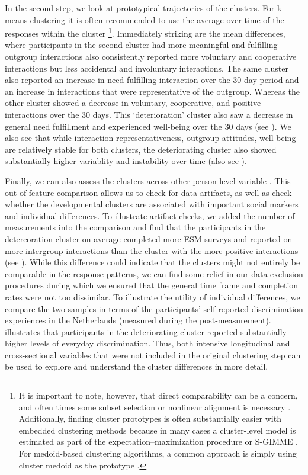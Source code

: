 In the second step, we look at prototypical trajectories of the
clusters. For k-means clustering it is often recommended to use the
average over time of the responses within the cluster
\citep[see ][]{niennattrakul2007}\footnote{It is important to note, however, that direct comparability can be a concern, and often times some subset selection or nonlinear alignment is necessary \citep[e.g.,][]{gupta1996}. Additionally, finding cluster prototypes is often substantially easier with embedded clustering methods because in many cases a cluster-level model is estimated as part of the expectation–maximization procedure \citep[e.g.,][]{denteuling2021} or S-GIMME \citep[e.g.][]{lane2019}. For medoid-based clustering algorithms, a common approach is simply using cluster medoid as the prototype \citep{kaufman1990}.}.
Immediately striking are the mean differences, where participants in the
second cluster had more meaningful and fulfilling outgroup interactions
also consistently reported more voluntary and cooperative interactions
but less accidental and involuntary interactions. The same cluster also
reported an increase in need fulfilling interaction over the 30 day
period and an increase in interactions that were representative of the
outgroup. Whereas the other cluster showed a decrease in voluntary,
cooperative, and positive interactions over the 30 days. This
`deterioration' cluster also saw a decrease in general need fulfillment
and experienced well-being over the 30 days (see
). We also see that while interaction
representativeness, outgroup attitudes, well-being are relatively stable
for both clusters, the deteriorating cluster also showed substantially
higher variablity and instability over time (also see
).

Finally, we can also assess the clusters across other person-level
variable \citep[e.g.,][]{monden2022}. This out-of-feature comparison
allows us to check for data artifacts, as well as check whether the
developmental clusters are associated with important social markers and
individual differences. To illustrate artifact checks, we added the
number of measurements into the comparison and find that the
participants in the detereoration cluster on average completed more ESM
surveys and reported on more intergroup interactions than the cluster
with the more positive interactions (see ).
While this difference could indicate that the clusters might not
entirely be comparable in the response patterns, we can find some relief
in our data exclusion procedures during which we ensured that the
general time frame and completion rates were not too dissimilar. To
illustrate the utility of individual differences, we compare the two
samples in terms of the participants' self-reported discrimination
experiences in the Netherlands (measured during the post-measurement).
 illustrates that participants in the
deteriorating cluster reported substantially higher levels of everyday
discrimination. Thus, both intensive longitudinal and cross-sectional
variables that were not included in the original clustering step can be
used to explore and understand the cluster differences in more detail.

